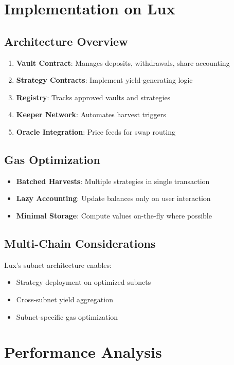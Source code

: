 \documentclass[11pt,a4paper]{article}
\theoremstyle{definition}
\begin{document}
\section{Implementation on Lux}

\subsection{Architecture Overview}

\begin{enumerate}
\item \textbf{Vault Contract}: Manages deposits, withdrawals, share accounting
\item \textbf{Strategy Contracts}: Implement yield-generating logic
\item \textbf{Registry}: Tracks approved vaults and strategies
\item \textbf{Keeper Network}: Automates harvest triggers
\item \textbf{Oracle Integration}: Price feeds for swap routing
\end{enumerate}

\subsection{Gas Optimization}

\begin{itemize}
\item \textbf{Batched Harvests}: Multiple strategies in single transaction
\item \textbf{Lazy Accounting}: Update balances only on user interaction
\item \textbf{Minimal Storage}: Compute values on-the-fly where possible
\end{itemize}

\subsection{Multi-Chain Considerations}

Lux's subnet architecture enables:
\begin{itemize}
\item Strategy deployment on optimized subnets
\item Cross-subnet yield aggregation
\item Subnet-specific gas optimization
\end{itemize}

\section{Performance Analysis}
\end{document}
